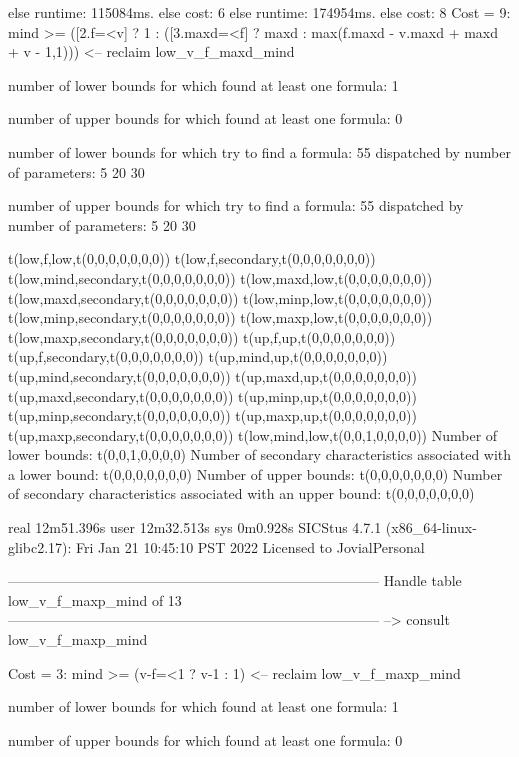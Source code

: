 else runtime: 115084ms. else cost: 6
else runtime: 174954ms. else cost: 8
Cost =  9:  mind >= ([2.f=<v] ? 1 : ([3.maxd=<f] ? maxd : max(f.maxd - v.maxd + maxd + v - 1,1))) %
<-- reclaim low_v_f_maxd_mind

number of lower bounds for which found at least one formula: 1

number of upper bounds for which found at least one formula: 0

number of lower bounds for which try to find a formula: 55
dispatched by number of parameters: 5  20  30

number of upper bounds for which try to find a formula: 55
dispatched by number of parameters: 5  20  30

t(low,f,low,t(0,0,0,0,0,0,0))
t(low,f,secondary,t(0,0,0,0,0,0,0))
t(low,mind,secondary,t(0,0,0,0,0,0,0))
t(low,maxd,low,t(0,0,0,0,0,0,0))
t(low,maxd,secondary,t(0,0,0,0,0,0,0))
t(low,minp,low,t(0,0,0,0,0,0,0))
t(low,minp,secondary,t(0,0,0,0,0,0,0))
t(low,maxp,low,t(0,0,0,0,0,0,0))
t(low,maxp,secondary,t(0,0,0,0,0,0,0))
t(up,f,up,t(0,0,0,0,0,0,0))
t(up,f,secondary,t(0,0,0,0,0,0,0))
t(up,mind,up,t(0,0,0,0,0,0,0))
t(up,mind,secondary,t(0,0,0,0,0,0,0))
t(up,maxd,up,t(0,0,0,0,0,0,0))
t(up,maxd,secondary,t(0,0,0,0,0,0,0))
t(up,minp,up,t(0,0,0,0,0,0,0))
t(up,minp,secondary,t(0,0,0,0,0,0,0))
t(up,maxp,up,t(0,0,0,0,0,0,0))
t(up,maxp,secondary,t(0,0,0,0,0,0,0))
t(low,mind,low,t(0,0,1,0,0,0,0))
Number of lower bounds:                                             t(0,0,1,0,0,0,0)
Number of secondary characteristics associated with a lower bound:  t(0,0,0,0,0,0,0)
Number of upper bounds:                                             t(0,0,0,0,0,0,0)
Number of secondary characteristics associated with an upper bound: t(0,0,0,0,0,0,0)

real	12m51.396s
user	12m32.513s
sys	0m0.928s
SICStus 4.7.1 (x86_64-linux-glibc2.17): Fri Jan 21 10:45:10 PST 2022
Licensed to JovialPersonal


--------------------------------------------------------------------------------
Handle table low_v_f_maxp_mind of 13
--------------------------------------------------------------------------------
--> consult low_v_f_maxp_mind

Cost =  3:  mind >= (v-f=<1 ? v-1 : 1)
<-- reclaim low_v_f_maxp_mind

number of lower bounds for which found at least one formula: 1

number of upper bounds for which found at least one formula: 0

